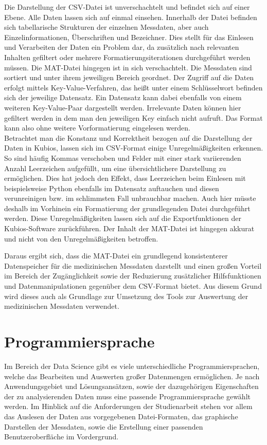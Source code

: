 Die Darstellung der \acs{CSV}-Datei ist unverschachtelt und befindet sich auf einer Ebene. Alle Daten lassen sich auf einmal einsehen. Innerhalb der Datei befinden sich tabellarische Strukturen der einzelnen Messdaten, aber auch Einzelinformationen, Überschriften und Bezeichner. Dies stellt für das Einlesen und Verarbeiten der Daten ein Problem dar, da zusätzlich nach relevanten Inhalten gefiltert oder mehrere Formatierungsiterationen durchgeführt werden müssen. Die MAT-Datei hingegen ist in sich verschachtelt. Die Messdaten sind sortiert und unter ihrem jeweiligen Bereich geordnet. Der Zugriff auf die Daten erfolgt mittels Key-Value-Verfahren, das heißt unter einem Schlüsselwort befinden sich der jeweilige Datensatz. Ein Datensatz kann dabei ebenfalls von einem weiteren Key-Value-Paar dargestellt werden. Irrelevante Daten können hier gefiltert werden in dem man den jeweiligen Key einfach nicht aufruft. Das Format kann also ohne weitere Vorformatierung eingelesen werden.\\
Betrachtet man die Konstanz und Korrektheit bezogen auf die Darstellung der Daten in Kubios, lassen sich im \acs{CSV}-Format einige Unregelmäßigkeiten erkennen. So sind häufig Kommas verschoben und Felder mit einer stark variierenden Anzahl Leerzeichen aufgefüllt, um eine übersichtlichere Darstellung zu ermöglichen. Dies hat jedoch den Effekt, dass Leerzeichen beim Einlesen mit beispielsweise Python ebenfalls im Datensatz auftauchen und diesen verunreinigen bzw. im schlimmsten Fall unbrauchbar machen. Auch hier müsste deshalb im Vorhinein ein Formatierung der grundlegenden Datei durchgeführt werden. Diese Unregelmäßigkeiten lassen sich auf die Exportfunktionen der Kubios-Software zurückführen. Der Inhalt der MAT-Datei ist hingegen akkurat und nicht von den Unregelmäßigkeiten betroffen.

Daraus ergibt sich, dass die MAT-Datei ein grundlegend konsistenterer Datenspeicher für die medizinischen Messdaten darstellt und einen großen Vorteil im Bereich der Zugänglichkeit sowie der Reduzierung zusätzlicher Hilfsfunktionen und Datenmanipulationen gegenüber dem \acs{CSV}-Format bietet. Aus diesem Grund wird dieses auch als Grundlage zur Umsetzung des Tools zur Auswertung der medizinischen Messdaten verwendet.


\section{Programmiersprache}

Im Bereich der Data Science gibt es viele unterschiedliche Programmiersprachen, welche das Bearbeiten und Auswerten großer Datenmengen ermöglichen. Je nach Anwendungsgebiet und Lösungsansätzen, sowie der dazugehörigen Eigenschaften der zu analysierenden Daten muss eine passende Programmiersprache gewählt werden. Im Hinblick auf die Anforderungen der Studienarbeit stehen vor allem das Auslesen der Daten aus vorgegebenen Datei-Formaten, das graphische Darstellen der Messdaten, sowie die Erstellung einer passenden Benutzeroberfläche im Vordergrund.\cite{dataSciLang}

